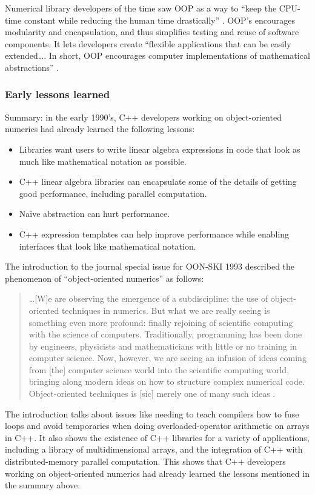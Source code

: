 Numerical library developers of the time saw OOP as a way to ``keep
the CPU-time constant while reducing the human time
drastically'' \cite{arge1996oon}.  OOP's encourages modularity and
encapsulation, and thus simplifies testing and reuse of software
components. It lets developers create ``flexible applications that can
be easily extended\dots.  In short, OOP encourages computer
implementations of mathematical abstractions'' \cite{arge1996oon}.

\subsubsection{Early lessons learned}

Summary: in the early 1990's, C++ developers working on
object-oriented numerics had already learned the following lessons:
\begin{itemize}
\item Libraries want users to write linear algebra expressions in code
  that look as much like mathematical notation as possible.
\item C++ linear algebra libraries can encapsulate some of the details
  of getting good performance, including parallel computation.
\item Na\"ive abstraction can hurt performance.
\item C++ expression templates can help improve performance while
  enabling interfaces that look like mathematical notation.
\end{itemize}

The introduction to the journal special issue for OON-SKI 1993
described the phenomenon of ``object-oriented numerics'' as follows:
\begin{quote}
  \ldots [W]e are observing the emergence of a subdiscipline: the use
  of object-oriented techniques in numerics. But what we are really
  seeing is something even more profound: finally rejoining of
  scientific computing with the science of computers. Traditionally,
  programming has been done by engineers, physicists and
  mathematicians with little or no training in computer science. Now,
  however, we are seeing an infusion of ideas coming from [the]
  computer science world into the scientific computing world, bringing
  along modern ideas on how to structure complex numerical
  code. Object-oriented techniques is [sic] merely one of many such
  ideas \cite{Vermeulen1993}.
\end{quote}
The introduction talks about issues like needing to teach compilers
how to fuse loops and avoid temporaries when doing overloaded-operator
arithmetic on arrays in C++. It also shows the existence of C++
libraries for a variety of applications, including a library of
multidimensional arrays, and the integration of C++ with
distributed-memory parallel computation.  This shows that C++
developers working on object-oriented numerics had already learned the
lessons mentioned in the summary above.

